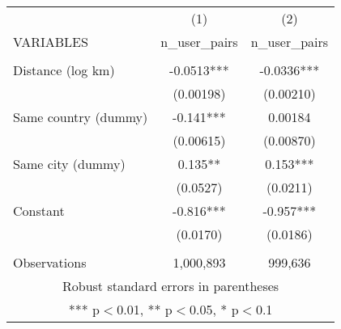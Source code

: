 \begin{tabular}{lcc} \hline
 & (1) & (2) \\
VARIABLES & n\_user\_pairs & n\_user\_pairs \\ \hline
 &  &  \\
Distance (log km) & -0.0513*** & -0.0336*** \\
 & (0.00198) & (0.00210) \\
Same country (dummy) & -0.141*** & 0.00184 \\
 & (0.00615) & (0.00870) \\
Same city (dummy) & 0.135** & 0.153*** \\
 & (0.0527) & (0.0211) \\
Constant & -0.816*** & -0.957*** \\
 & (0.0170) & (0.0186) \\
 &  &  \\
 Observations & 1,000,893 & 999,636 \\ \hline
\multicolumn{3}{c}{ Robust standard errors in parentheses} \\
\multicolumn{3}{c}{ *** p$<$0.01, ** p$<$0.05, * p$<$0.1} \\
\end{tabular}
